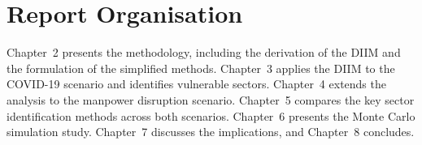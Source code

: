 \section{Report Organisation}

Chapter~2 presents the methodology, including the derivation of the DIIM and the formulation of the simplified methods. Chapter~3 applies the DIIM to the COVID-19 scenario and identifies vulnerable sectors. Chapter~4 extends the analysis to the manpower disruption scenario. Chapter~5 compares the key sector identification methods across both scenarios. Chapter~6 presents the Monte Carlo simulation study. Chapter~7 discusses the implications, and Chapter~8 concludes.

\newpage
